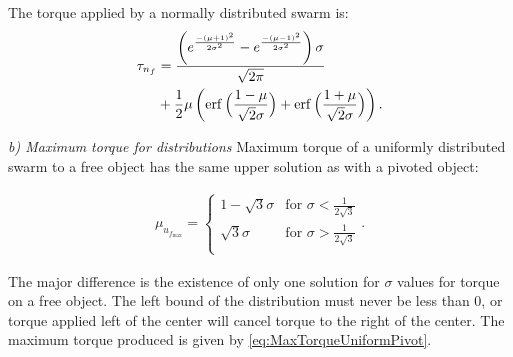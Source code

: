 The torque applied by a normally distributed swarm is:
\begin{align} \nonumber
\tau_{n_f} &= \frac{\left(e^{\frac{-(\mu+1)^2}{2\sigma^2}}-e^{\frac{-(\mu-1)^2}{2\sigma^2}}\right)\sigma}{\sqrt{2\pi}}\\
 &+ \frac{1}{2}\mu\left(\operatorname{erf}\Big(\frac{1-\mu}{\sqrt{2}\sigma}\Big)+\operatorname{erf}\Big(\frac{1+\mu}{\sqrt{2}\sigma}\Big)\right) .
\end{align}


\emph{b) Maximum torque for distributions}
Maximum torque of a uniformly distributed swarm to a free object has the same upper solution as with a pivoted object:

\begin{align}\label{eq:maxMuFree}
\mu_{u_{f_\max}}=\left\{
\begin{array}{ll}
1-\sqrt{3}\sigma &   \textrm{for     } \sigma < \frac{1}{2\sqrt{3}}\\
\sqrt{3}\sigma &   \textrm{for     } \sigma > \frac{1}{2\sqrt{3}}\\
\end{array} 
\right. .
\end{align}

The major difference is the existence of only one solution for $\sigma$ values for torque on a free object. The left bound of the distribution must never be less than 0, or torque applied left of the center will cancel torque to the right of the center. 
 The maximum torque produced is given by \eqref{eq:MaxTorqueUniformPivot}.

